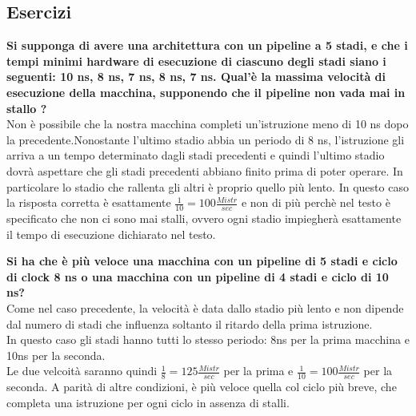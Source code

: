 \documentclass[a4paper,12pt, oneside]{book}
\begin{document}
\subsection{Esercizi}
\begin{esercizio}
\textbf{Si supponga di avere una architettura con un pipeline a 5
  stadi, e che i tempi minimi hardware di esecuzione di ciascuno
  degli stadi siano i seguenti: 10 ns, 8 ns, 7 ns, 8 ns, 7 ns.
  Qual'è la massima velocità di esecuzione della macchina, supponendo
  che il pipeline non vada mai in stallo ?}\\
Non è possibile che la nostra macchina completi un'istruzione meno di
10 ns dopo la precedente.Nonostante l'ultimo stadio abbia un periodo
di 8 ns, l'istruzione gli arriva a un tempo determinato dagli stadi
precedenti e quindi l'ultimo stadio dovrà aspettare che gli stadi
precedenti abbiano finito prima di poter operare. In particolare lo
stadio che rallenta gli altri è proprio quello più lento.
In questo caso la risposta corretta è esattamente $\frac{1}{10} = 100 \frac{Mistr}{sec}$
e non di più perchè nel testo è specificato che non ci sono mai
stalli, ovvero ogni stadio impiegherà esattamente il tempo di
esecuzione dichiarato nel testo.
\end{esercizio}
\begin{esercizio}
  \textbf{Si ha che è più veloce una macchina con un pipeline di 5 stadi
    e ciclo di clock 8 ns o una macchina con un pipeline di 4 stadi
    e ciclo di 10 ns?}\\
  Come nel caso precedente, la velocità è data dallo stadio più
  lento e non dipende dal numero di stadi che influenza soltanto
  il ritardo della prima istruzione.\\
  In questo caso gli stadi hanno tutti lo stesso periodo:
  8ns per la prima macchina e 10ns per la seconda.\\
  Le due velcoità saranno quindi $\frac{1}{8} = 125 \frac{Mistr}{sec}$
  per la prima e $\frac{1}{10} = 100 \frac{Mistr}{sec}$ per la
  seconda.
  A parità di altre condizioni, è più veloce quella col ciclo
  più breve, che completa una istruzione per ogni ciclo in assenza di stalli.
\end{esercizio}
\end{document}

